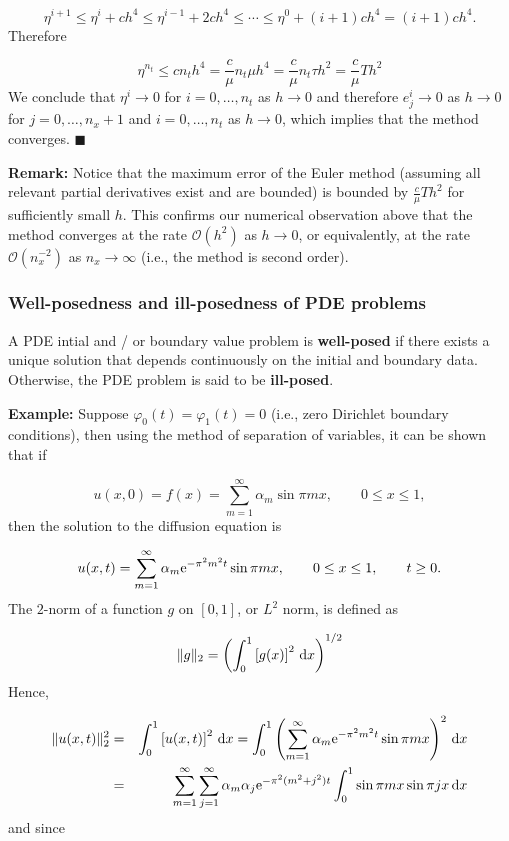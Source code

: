 \documentclass[12pt,a4paper]{article}
\begin{document}
\[
\eta^{i+1} \leq \eta^i  + ch^4 \leq \eta^{i-1} + 2ch^4 \leq \cdots \leq \eta^{0} + (i+1)ch^4 = (i+1)ch^4.
\]
Therefore

\[
\eta^{n_t} \leq c n_th^4 = \frac{c}{\mu} n_t\mu h^4 = \frac{c}{\mu} n_t\tau h^2 = \frac{c}{\mu}T h^2 
\]
We conclude that $\eta^i \to 0$ for $i = 0, \ldots, n_t$ as $h \to 0$ and therefore $e^i_j \to 0$ as $h \to 0$ for $j = 0, \ldots, n_x + 1$ and $i = 0, \ldots, n_t$ as $h \to 0$, which implies that the method converges.   $\blacksquare$

\textbf{Remark:} Notice that the maximum error of the Euler method (assuming all relevant partial derivatives exist and are bounded) is bounded by $\frac{c}{\mu}T h^2$ for sufficiently small $h$. This confirms our numerical observation above that the method converges at the rate $\mathcal{O}(h^2)$ as $h \to 0$, or equivalently, at the rate $\mathcal{O}(n_x^{-2})$ as $n_x \to \infty$ (i.e., the method is second order).

\subsubsection{Well-posedness and ill-posedness of PDE problems}
A PDE intial and / or boundary value problem is \textbf{well-posed} if there exists a unique solution that depends continuously on the initial and boundary data.  Otherwise, the PDE problem is said to be \textbf{ill-posed}.

\textbf{Example:}  Suppose $\varphi_0(t) = \varphi_1(t) = 0$ (i.e., zero Dirichlet boundary conditions), then using the method of separation of variables, it can be shown that if

\[
u(x,0) = f(x) = \sum_{m = 1}^{\infty}\alpha_m \sin \pi m x, \qquad 0 \leq x \leq 1,
\]
then the solution to the diffusion equation is

\[
u(x,t) = \sum_{m = 1}^{\infty}\alpha_m {\rm e}^{-\pi^2m^2 t} \sin \pi m x, \qquad 0 \leq x \leq 1, \qquad t \geq 0.
\]
The $2$-norm of a function $g$ on $[0, 1]$, or $L^2$ norm, is defined as

\[
\| g \|_2 = \left( \int_0^1 \left[g(x)\right]^2\,{\rm d}x   \right)^{1/2}
\]
Hence,


\begin{eqnarray*}
\|u(x,t)\|_2^2 &=& \int_0^1 \left[u(x,t)\right]^2\,{\rm d}x  = \int_0^1 \left(\sum_{m = 1}^{\infty}\alpha_m {\rm e}^{-\pi^2m^2 t} \sin \pi m x  \right)^2\,{\rm d}x \\
&=& \sum_{m=1}^{\infty}\sum_{j=1}^{\infty} \alpha_m \alpha_j{\rm e}^{-\pi^2(m^2 + j^2) t}\int_0^1 \sin\pi m x\sin \pi j x\, {\rm d}x
\end{eqnarray*}
and since
\end{document}
